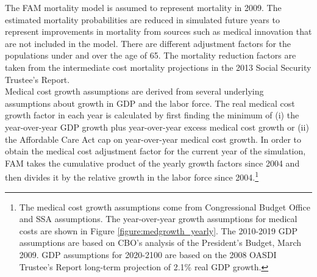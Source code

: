 
\noindent The FAM mortality model is assumed to represent mortality in 2009.
The estimated mortality probabilities are reduced in simulated future years to represent improvements in mortality from sources such as medical innovation that are not included in the model.
There are different adjustment factors for the populations under and over the age of 65.
The mortality reduction factors are taken from the intermediate cost mortality projections in the 2013 Social Security Trustee's Report. \\


\noindent Medical cost growth assumptions are derived from several underlying assumptions about growth in GDP and the labor force.
The real medical cost growth factor in each year is calculated by first finding the minimum of (i) the year-over-year GDP growth plus year-over-year excess medical cost growth or (ii) the Affordable Care Act cap on year-over-year medical cost growth. In order to obtain the medical cost adjustment factor for the current year of the simulation, FAM takes the cumulative product of the yearly growth factors since 2004 and then divides it by the relative growth in the labor force since 2004.\footnote{The medical cost growth assumptions come from Congressional Budget Office and SSA assumptions.
The year-over-year growth assumptions for medical costs are shown in Figure \ref{figure:medgrowth_yearly}.
The 2010-2019 GDP assumptions are based on CBO's analysis of the President's Budget, March 2009.
GDP assumptions for 2020-2100 are based on the 2008 OASDI Trustee's Report long-term projection of 2.1\% real GDP growth.} \\


